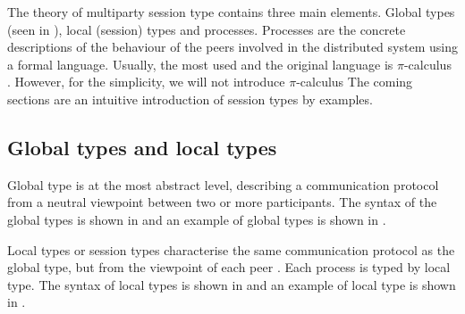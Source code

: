 The theory of multiparty session type contains three main elements. Global types (seen in ), local (session) types and processes. Processes are the concrete descriptions of the behaviour of the peers involved in the distributed system \cite{coppoGentleIntroductionMultiparty2015} using a formal language. Usually, the most used and the original language is $\pi$-calculus \cite{milnerCalculusMobileProcesses1992}.  However, for the simplicity, we will not introduce $\pi$-calculus %
The coming sections are an intuitive introduction of session types by examples.
\subsection{Global types and local types} \label{b:mpst:st}
Global type is at the most abstract level, describing a communication protocol from a neutral viewpoint between two or more participants\cite{coppoGentleIntroductionMultiparty2015}. The syntax of the global types is shown in  and an example of global types is shown in .

Local types or session types characterise the same communication protocol as the global type, but from the viewpoint of each peer \cite{coppoGentleIntroductionMultiparty2015}. Each process is typed by local type. The syntax of local types is shown in  and an example of local type is shown in . 

